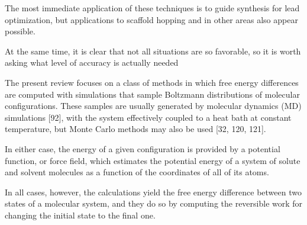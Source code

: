 The most immediate application of these techniques is to guide synthesis for lead optimization, but applications to scaffold
hopping and in other areas also appear possible.

At the same time, it is clear that not all situations are
so favorable, so it is worth asking what level of accuracy
is actually needed

The present review focuses on a class of methods in
which free energy differences are computed with simulations that sample Boltzmann distributions of molecular configurations. These samples are usually generated by molecular dynamics (MD) simulations [92], with
the system effectively coupled to a heat bath at constant temperature, but Monte Carlo methods may also
be used [32, 120, 121]. 

In either case, the energy of a
given configuration is provided by a potential function,
or force field, which estimates the potential energy of
a system of solute and solvent molecules as a function
of the coordinates of all of its atoms.

In
all cases, however, the calculations yield the free energy
difference between two states of a molecular system, and
they do so by computing the reversible work for changing
the initial state to the final one. 
